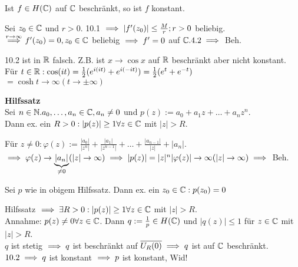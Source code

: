 \documentclass[a4paper,twoside,DIV15,BCOR12mm]{scrbook}
\begin{document}
\begin{satz}
Ist $f \in H(\mathbb{C} )$ auf $\mathbb{C}$ beschränkt, so ist $f$ konstant.
\end{satz}

\begin{beweis}
Sei $z_0 \in \mathbb{C}$ und $r > 0$. 10.1 $\implies |f'(z_0)| \leq \frac{M}{r}; r>0$ beliebig. \\
$\stackrel{r \to \infty}{\implies} f'(z_0) = 0, z_0 \in \mathbb{C}$ beliebig $\implies f' = 0$ auf $\mathbb{C}. 4.2 \implies$ Beh.
\end{beweis}

\begin{bemerkung}
10.2 ist in $\mathbb{R}$ falsch. Z.B. ist $x \to \cos x$ auf $\mathbb{R}$ beschränkt aber nicht konstant. Für $t \in \mathbb{R}: \cos (it) = \frac{1}{2}(e^{i(it)} + e^{i(-it)}) = \frac{1}{2}(e^t + e^{-t})$\\ 
$= \cosh t \to \infty (t \to \pm\infty )$
\end{bemerkung}

\textbf{Hilfssatz}\\
Sei $n \in \mathbb{N}. a_0,\ldots ,a_n \in \mathbb{C}, a_n \neq 0$ und $p(z):=a_0 + a_1z + \ldots + a_nz^n$. \\
Dann ex. ein $R>0: |p(z)| \geq 1 \forall z \in \mathbb{C}$ mit $|z| > R$.

\begin{beweis}
Für $z \neq 0: \varphi (z) := \frac{|a_0|}{|z^n|} + \frac{|a_1|}{|z^{n-1}|} + \ldots + \frac{|a_{n-1}|}{|z|} + |a_n|$.\\
$\implies \varphi (z) \to \underbrace{|a_n|}_{\neq 0} (|z| \to \infty) \implies |p(z)| = |z|^n |\varphi(z)| \to \infty (|z| \to \infty) \implies$ Beh.
\end{beweis}

\begin{satz}
Sei $p$ wie in obigem Hilfssatz. Dann ex. ein $z_0 \in \mathbb{C}: p(z_0) = 0$
\end{satz}

\begin{beweis}
Hilfssatz $\implies \exists R>0 : |p(z)|\geq 1 \forall z \in \mathbb{C}$ mit $|z|>R$.\\
Annahme: $p(z) \neq 0 \forall z \in \mathbb{C}$. Dann $q:=\frac{1}{p} \in H(\mathbb{C})$ und $|q(z)|\leq 1$ für $z\in \mathbb{C}$ mit $|z| > R$. \\
$q$ ist stetig $\implies q$ ist beschränkt auf $\overline{U_R(0)} \implies q$ ist auf $\mathbb{C}$ beschränkt. \\
$10.2 \implies q$ ist konstant $\implies p$ ist konstant, Wid!
\end{beweis}
\end{document}

